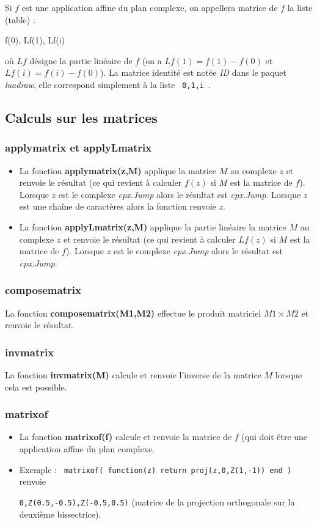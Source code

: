 Si $f$ est une application affine du plan complexe, on appellera matrice de $f$ la liste (table) :
\begin{Luacode}
{ f(0), Lf(1), Lf(i) }
\end{Luacode}
où $Lf$ désigne la partie linéaire de $f$ (on a $Lf(1) = f(1)-f(0)$ et $Lf(i)=f(i)-f(0)$). La matrice identité est notée \emph{ID} dans le paquet \emph{luadraw}, elle correspond simplement à la liste \texttt{ {0,1,i} }.

\subsection{Calculs sur les matrices}

\subsubsection{applymatrix et applyLmatrix}
\begin{itemize}
    \item La fonction \textbf{applymatrix(z,M)} applique la matrice $M$ au complexe $z$ et renvoie le résultat (ce qui revient à calculer $f(z)$ si $M$ est la matrice de $f$). Lorsque $z$ est le complexe \emph{cpx.Jump} alors le résultat est \emph{cpx.Jump}. Lorsque $z$ est une chaîne de caractères alors la fonction renvoie $z$.
    \item La fonction \textbf{applyLmatrix(z,M)} applique la partie linéaire la matrice $M$ au complexe $z$ et renvoie le résultat (ce qui revient à calculer $Lf(z)$ si $M$ est la matrice de $f$). Lorsque $z$ est le complexe \emph{cpx.Jump} alors le résultat est \emph{cpx.Jump}.
\end{itemize}

\subsubsection{composematrix}
La fonction \textbf{composematrix(M1,M2)} effectue le produit matriciel $M1\times M2$ et renvoie le résultat.

\subsubsection{invmatrix}
La fonction \textbf{invmatrix(M)} calcule et renvoie l'inverse de la matrice $M$ lorsque cela est possible.

\subsubsection{matrixof}
\begin{itemize}
    \item La fonction \textbf{matrixof(f)} calcule et renvoie la matrice de $f$ (qui doit être une application affine du plan complexe.
    \item Exemple : \texttt{ matrixof( function(z) return proj(z,{0,Z(1,-1)}) end )} renvoie \par
     \texttt{{0,Z(0.5,-0.5),Z(-0.5,0.5)}} (matrice de la projection orthogonale sur la deuxième bissectrice).
\end{itemize}

